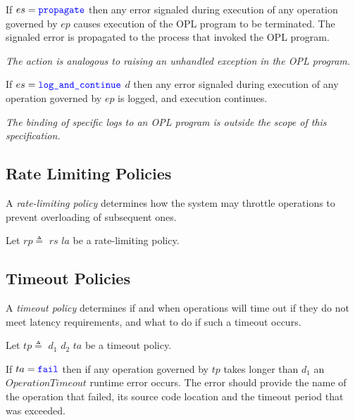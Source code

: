 \documentclass{article}
\begin{document}
If $es = \texttt{\color{blue} propagate}$  then any error signaled during execution of any operation governed by $ep$ causes execution of the OPL program to be terminated. The signaled error is propagated to the process that invoked the OPL program.

{\em The \PROPAGATE{} action is analogous to raising an unhandled exception in the OPL program.}

If $es = \texttt{\color{blue} log\_and\_continue}$ $d$ then any error signaled during execution of any operation governed by $ep$ is logged, and execution continues.

{\em The binding of specific logs to an OPL program is outside the scope of this specification.}


\label{retryPolicies}

\subsection{Rate Limiting Policies}
\label{rateLimitingPolicies}

A {\em rate-limiting policy} determines how the system may throttle operations to prevent overloading of subsequent ones.


\RateLimitPolicy{}
\RateLimitConfig{}
\RateLimitStrategy{}
\LimitAction{}
\TokenBucketConfig{}
\FixedWindowConfig{}
\SlidingWindowConfig{}
\Rate{}

Let $rp \triangleq$ \POLICY{} \RATELIMIT{} \LCURLY{}
   \STRATEGY \COLON{} $rs$ \COMMA      
    \ONLIMIT \COLON{} $la$ 
    \RCURLY{} be a rate-limiting policy.

\subsection{Timeout Policies}
\label{timeoutPolicies}

A {\em timeout policy} determines if and when operations will time out if they do not meet latency requirements, and what to do if such a timeout occurs.


\TimeoutPolicy{}
\TimeoutConfig{}
\TimeoutAction{}

Let $tp \triangleq$ \POLICY{} \TIMEOUT{} \LCURLY
  \OPERATION\COLON{}$d_1$ \COMMA \PIPELINE\COLON{} $d_2$ \COMMA \ONTIMEOUT\COLON{} $ta$  \RCURLY{} be a timeout policy.
  
  If $ta = \texttt{\color{blue} fail}$ then  if any operation governed by $tp$ takes longer than $d_1$ an $OperationTimeout$ runtime error occurs. The error should provide the name of the operation that failed, its source code location and the timeout period that was exceeded.       
\end{document}

